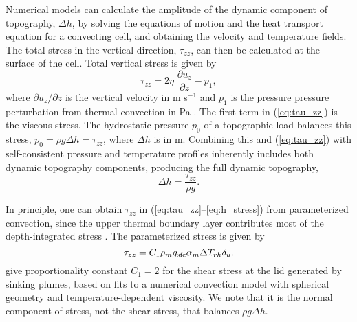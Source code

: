 
Numerical models can calculate the amplitude of the dynamic component of topography, $\Delta h$, by solving the equations of motion and the heat transport equation for a convecting cell, and obtaining the velocity and temperature fields. The total stress in the vertical direction, $\tau_{zz}$, can then be calculated at the surface of the cell. Total vertical stress is given by 
\begin{equation}\label{eq:tau_zz}
\tau_{zz} = 2\eta \; \frac{\partial u_z}{\partial z} - p_1,
\end{equation}
where $\partial u_z / \partial z$ is the vertical velocity in m s$^{-1}$ and $p_1$ is the pressure pressure perturbation from thermal convection in Pa \citep{Parsons1983}. The first term in (\ref{eq:tau_zz}) is the viscous stress. The hydrostatic pressure $p_0$ of a topographic load balances this stress, $p_0 = \rho g \Delta h = \tau_{zz}$, where $\Delta h$ is in m. Combining this and (\ref{eq:tau_zz}) with self-consistent pressure and temperature profiles inherently includes both dynamic topography components, producing the full dynamic topography,
\begin{equation}\label{eq:h_stress}
\Delta h = \frac{\tau_{zz}}{\rho g}.
\end{equation} 




In principle, one can obtain $\tau_{zz}$ in (\ref{eq:tau_zz}--\ref{eq:h_stress}) from parameterized convection, since the upper thermal boundary layer contributes most of the depth-integrated stress \citep{Parsons1983, Solomatov1995}. The parameterized stress is given by
\begin{equation}\label{eq:tau_param}
\tau_{zz} = C_1 \rho_m g_{\rm sfc} \alpha_m \Delta T_{rh} \delta_u.
\end{equation}
\citet{Reese2005} give proportionality constant $C_1 = 2$ for the shear stress at the lid generated by sinking plumes, based on fits to a numerical convection model with spherical geometry and temperature-dependent viscosity. We note that it is the normal component of stress, not the shear stress, that balances $\rho g \Delta h$. %

